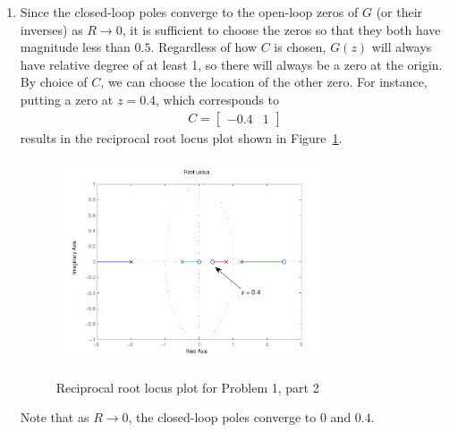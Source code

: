 \begin{enumerate}
    \item
    Since the closed-loop poles converge to the open-loop zeros of $G$ (or their inverses) as $R \rightarrow 0$, it is sufficient to choose the zeros so that they both have magnitude less than $0.5$. Regardless of how $C$ is chosen, $G(z)$ will always have relative degree of at least 1, so there will always be a zero at the origin. By choice of $C$, we can choose the location of the other zero. For instance, putting a zero at $z=0.4$, which corresponds to
    \begin{align*}
        C = \begin{bmatrix}
                -0.4 & 1
            \end{bmatrix}
    \end{align*}
    results in the reciprocal root locus plot shown in Figure~\ref{fig:finalp1_rl2}.
    \begin{figure}
        \centering
        \includegraphics[width=8cm]{finalp1_rl2}\\
        \caption{Reciprocal root locus plot for Problem 1, part 2}
        \label{fig:finalp1_rl2}
    \end{figure}    
    Note that as $R \rightarrow 0$, the closed-loop poles converge to $0$ and $0.4$.
    
\end{enumerate} 